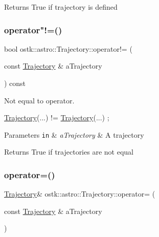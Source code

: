 \begin{DoxyReturn}{Returns}
True if trajectory is defined 
\end{DoxyReturn}
\mbox{\label{classostk_1_1astro_1_1_trajectory_abb524dcee260456d546f5e01ee9c228c}} 
\subsubsection{\texorpdfstring{operator"!=()}{operator!=()}}
{\footnotesize\ttfamily bool ostk\+::astro\+::\+Trajectory\+::operator!= (\begin{DoxyParamCaption}\item[{const \hyperlink{classostk_1_1astro_1_1_trajectory}{Trajectory} \&}]{a\+Trajectory }\end{DoxyParamCaption}) const}



Not equal to operator. 


\begin{DoxyCode}
\hyperlink{classostk_1_1astro_1_1_trajectory_a9333200bd6afed5aef4f5aad8a2a8e84}{Trajectory}(...) != \hyperlink{classostk_1_1astro_1_1_trajectory_a9333200bd6afed5aef4f5aad8a2a8e84}{Trajectory}(...) ;
\end{DoxyCode}



\begin{DoxyParams}[1]{Parameters}
\mbox{\tt in}  & {\em a\+Trajectory} & A trajectory \\
\hline
\end{DoxyParams}
\begin{DoxyReturn}{Returns}
True if trajectories are not equal 
\end{DoxyReturn}
\mbox{\label{classostk_1_1astro_1_1_trajectory_aeefb959ee88abfd6547e9cf4e462ca3e}} 
\subsubsection{\texorpdfstring{operator=()}{operator=()}}
{\footnotesize\ttfamily \hyperlink{classostk_1_1astro_1_1_trajectory}{Trajectory}\& ostk\+::astro\+::\+Trajectory\+::operator= (\begin{DoxyParamCaption}\item[{const \hyperlink{classostk_1_1astro_1_1_trajectory}{Trajectory} \&}]{a\+Trajectory }\end{DoxyParamCaption})\hspace{0.3cm}{\ttfamily [delete]}}



